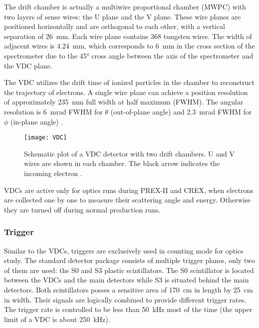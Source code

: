 The drift chamber is actually a multiwire proportional chamber (MWPC) with two 
layers of sense wires: the U plane and the V plane. These wire planes are positioned horizontally and are orthogonal to each other, with a vertical separation of 26~mm. Each wire plane contains 368 tungsten wires. The width of adjacent wires is 4.24~mm, which corresponds to 6~mm in the cross section of the spectrometer due to the 45° cross angle between the axis of the spectrometer and the VDC plane.

The VDC utilizes the drift time of ionized particles in the chamber to reconstruct the trajectory of electrons. A single wire plane can achieve a position resolution of approximately 235~mm full width at half maximum (FWHM). The angular resolution is 6~mrad FWHM for $\theta$ (out-of-plane angle) and 2.3~mrad FWHM for $\phi$ (in-plane angle) \cite{FISSUM2001108}.
\begin{figure}[!h]
    \centering
    \texttt{[image: VDC]}
    \caption[VDC]{Schematic plot of a VDC detector with two drift chambers.
    U and V wires are shown in each chamber. The black arrow indicates the 
    incoming electron \cite{FISSUM2001108}.
    }
\end{figure}

VDCs are active only for optics runs during PREX-II and CREX, when electrons
are collected one by one to measure their scattering angle and energy. Otherwise 
they are turned off during normal production runs.


\subsubsection{Trigger}
Similar to the VDCs, triggers are exclusively used in counting mode for optics study. 
The standard detector package consists of multiple trigger planes, only two of them are used:
the S0 and S3 plastic scintillators. The S0 scintillator is located between the VDCs and the main
detectors while S3 is situated behind the main detectors. Both scintillators posses
a sensitive area of 170~cm in length by 25~cm in width. Their signals are logically combined to 
provide different trigger rates. The trigger rate is controlled to be less
than 50~kHz most of the time (the upper limit of a VDC is about 250~kHz).

